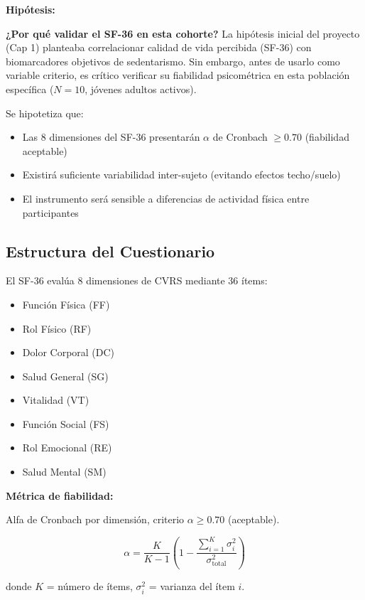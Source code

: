 \documentclass[12pt,letterpaper,twoside]{report}
\begin{document}
\begin{hipotesisbox}
\textbf{Hipótesis:}

\textbf{¿Por qué validar el SF-36 en esta cohorte?} La hipótesis inicial del proyecto (Cap 1) planteaba correlacionar calidad de vida percibida (SF-36) con biomarcadores objetivos de sedentarismo. Sin embargo, antes de usarlo como variable criterio, es crítico verificar su fiabilidad psicométrica en esta población específica ($N=10$, jóvenes adultos activos).

Se hipotetiza que:
\begin{itemize}[noitemsep]
    \item Las 8 dimensiones del SF-36 presentarán $\alpha$ de Cronbach $\geq 0.70$ (fiabilidad aceptable)
    \item Existirá suficiente variabilidad inter-sujeto (evitando efectos techo/suelo)
    \item El instrumento será sensible a diferencias de actividad física entre participantes
\end{itemize}
\end{hipotesisbox}

\subsection{Estructura del Cuestionario}

El SF-36 evalúa 8 dimensiones de CVRS mediante 36 ítems:
\begin{itemize}[noitemsep]
    \item Función Física (FF)
    \item Rol Físico (RF)
    \item Dolor Corporal (DC)
    \item Salud General (SG)
    \item Vitalidad (VT)
    \item Función Social (FS)
    \item Rol Emocional (RE)
    \item Salud Mental (SM)
\end{itemize}

\begin{estadisticobox}
\textbf{Métrica de fiabilidad:}

Alfa de Cronbach por dimensión, criterio $\alpha \geq 0.70$ (aceptable).

\begin{equation}
\alpha = \frac{K}{K-1} \left( 1 - \frac{\sum_{i=1}^{K} \sigma^2_i}{\sigma^2_{\text{total}}} \right)
\end{equation}

donde $K$ = número de ítems, $\sigma^2_i$ = varianza del ítem $i$.
\end{estadisticobox}
\end{document}
